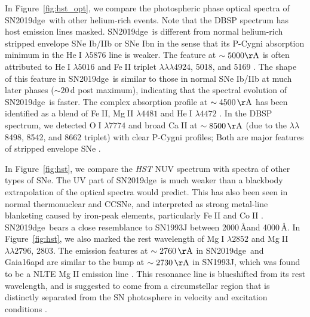\documentclass[twocolumn]{aastex63}
\newcommand{\name}{SN2019dge}
\def\ion#1#2{#1$\;${\footnotesize\rm{#2}}\relax}
\begin{document}
In Figure~\ref{fig:hst_opt}, we compare the photospheric phase optical spectra of 
\name\ with other helium-rich events. Note that the DBSP spectrum has host emission lines 
masked. \name\ is different from normal helium-rich stripped envelope SNe Ib/IIb or SNe Ibn in the 
sense that its P-Cygni absorption minimum in the \ion{He}{I} $\lambda5876$ line is weaker. The 
feature at $\sim5000{\rm \AA}$ is often attributed to \ion{He}{I} $\lambda 5016$ and \ion{Fe}{II} triplet 
$\lambda\lambda\lambda4924$, 5018, and 5169 \citep{Liu2016}. The shape of this feature in 
\name\ is similar to those in normal SNe Ib/IIb at much later phases ($\sim 20$\,d post maximum), 
indicating that the spectral evolution of \name\ is faster. The complex absorption profile at 
$\sim4500\,{\rm \AA}$ has been identified as a blend of \ion{Fe}{II}, \ion{Mg}{II} $\lambda 4481$ 
and \ion{He}{I} $\lambda 4472$ \citep{Hamuy2002}. In the DBSP spectrum, we detected \ion{O}{I} 
$\lambda 7774$ and broad \ion{Ca}{II} at $\sim8500\,{\rm \AA}$ (due to the
$\lambda\lambda$ 8498, 8542, and 8662 triplet) with clear P-Cygni profiles; Both are major features 
of stripped envelope SNe 
\citep{GalYam2017}. 

In Figure~\ref{fig:hst}, we compare the \textit{HST} NUV spectrum with spectra of other types of SNe. 
The UV part of \name\ is much weaker than a blackbody extrapolation of the optical spectra would 
predict. This has also been seen in normal thermonuclear and CCSNe, and interpreted as strong 
metal-line blanketing caused by iron-peak elements, particularly \ion{Fe}{II} and \ion{Co}{II} 
\citep{Gal-Yam2008}. \name\ bears a close resemblance to SN1993J between 2000\,\AA and 4000\,\AA. 
In Figure~\ref{fig:hst}, we also marked the rest wavelength of \ion{Mg}{I} $\lambda2852$ and 
\ion{Mg}{II} $\lambda \lambda 2796$, 2803. The emission features at $\sim2760\,{\rm \AA}$ in \name\ 
and Gaia16apd are similar to the bump at $\sim2730\,{\rm \AA}$ in SN1993J, which was found to be a 
NLTE \ion{Mg}{II} emission line \citep{Jeffery1994}. This resonance line is blueshifted from its rest 
wavelength, and is suggested to come from a circumstellar region that is distinctly separated from the 
SN photosphere in velocity and excitation conditions \citep{Panagia1980, Fransson1984}.
\end{document}
